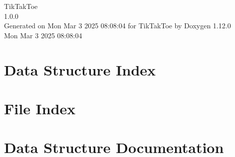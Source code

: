 \documentclass[twoside]{book}
\newcommand{\+}{\discretionary{\mbox{\scriptsize$\hookleftarrow$}}{}{}}
\newcommand{\clearemptydoublepage}{%
    \newpage{\pagestyle{empty}\cleardoublepage}%
  }
\begin{document}
  \raggedbottom
    \hypersetup{pageanchor=false,
                bookmarksnumbered=true,
                pdfencoding=unicode
               }
  \begin{titlepage}
  \vspace*{7cm}
  \begin{center}%
  {\Large Tik\+Tak\+Toe}\\
  [1ex]\large 1.\+0.\+0 \\
  \vspace*{1cm}
  {\large Generated on Mon Mar 3 2025 08\+:08\+:04 for Tik\+Tak\+Toe by Doxygen 1.12.0}\\
    \vspace*{0.5cm}
    {\small Mon Mar 3 2025 08:08:04}
  \end{center}
  \end{titlepage}
  \clearemptydoublepage
  \tableofcontents
  \clearemptydoublepage
  \hypersetup{pageanchor=true}



\chapter{Data Structure Index}

\chapter{File Index}

\chapter{Data Structure Documentation}







\end{document}
